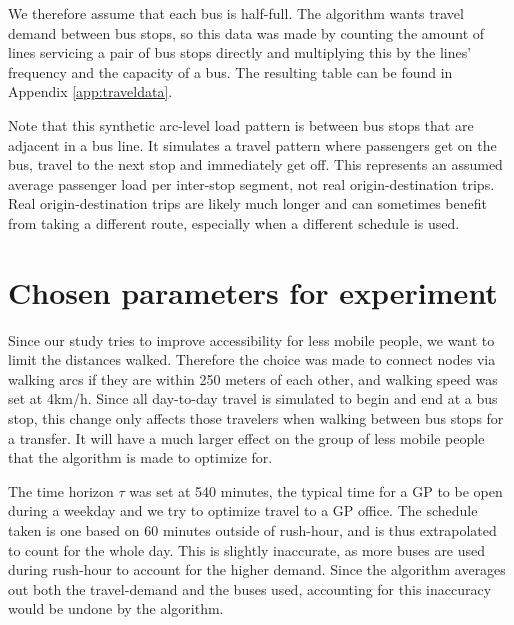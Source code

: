 We therefore assume that each bus is half-full. The algorithm wants travel demand between bus stops, so this data was made by counting the amount of lines servicing a pair of bus stops directly and multiplying this by the lines' frequency and the capacity of a bus. The resulting table can be found in Appendix \ref{app:traveldata}.

Note that this synthetic arc-level load pattern is between bus stops that are adjacent in a bus line. It simulates a travel pattern where passengers get on the bus, travel to the next stop and immediately get off. This represents an assumed average passenger load per inter-stop segment, not real origin-destination trips. Real origin-destination trips are likely much longer and can sometimes benefit from taking a different route, especially when a different schedule is used.



\section{Chosen parameters for experiment}
Since our study tries to improve accessibility for less mobile people, we want to limit the distances walked. Therefore the choice was made to connect nodes via walking arcs if they are within 250 meters of each other, and walking speed was set at 4km/h. Since all day-to-day travel is simulated to begin and end at a bus stop, this change only affects those travelers when walking between bus stops for a transfer. It will have a much larger effect on the group of less mobile people that the algorithm is made to optimize for.

The time horizon $\tau$ was set at 540 minutes, the typical time for a GP to be open during a weekday and we try to optimize travel to a GP office. The schedule taken is one based on 60 minutes outside of rush-hour, and is thus extrapolated to count for the whole day. This is slightly inaccurate, as more buses are used during rush-hour to account for the higher demand. Since the algorithm averages out both the travel-demand and the buses used, accounting for this inaccuracy would be undone by the algorithm.

